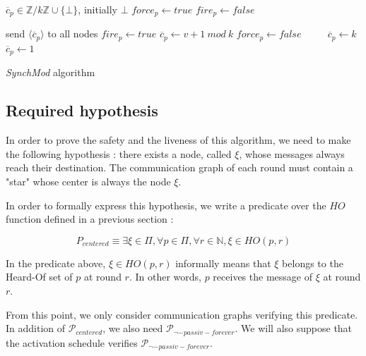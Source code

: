 \documentclass{article}
\begin{document}
\begin{algorithm}[htb]
\begin{distribalgo}[1]
\BLANK {}
	\STATE $\overline{c}_p \in \mathds{Z}/k\mathds{Z} \cup \{\bot\}$, initially $\bot$
	\STATE $force_p \leftarrow true$
	\STATE $fire_p \leftarrow false$

\ENDINDENT \BLANK

		\STATE send $\langle \overline{c}_p \rangle$ to all nodes
	\ENDINDENT
	\BLANK
			\STATE $fire_p \leftarrow true$
		\ENDIF
			\STATE $\overline{c}_p \leftarrow v+1~mod~k$
			\STATE $force_p \leftarrow false$ ~~~~
			\STATE $\overline{c}_p \leftarrow k$
		\ELSE
			\STATE $\overline{c}_p \leftarrow 1$ ~~~~
		\ENDIF
	\ENDINDENT
\ENDINDENT 
\caption{{\em SynchMod} algorithm} \label{algo:R}
\end{distribalgo}

\end{algorithm}

\subsection{Required hypothesis}

In order to prove the safety and the liveness of this algorithm, we need to make the following hypothesis :
there exists a node, called $\xi$, whose messages always reach their destination.
The communication graph of each round must contain a "star" whose center is always the node $\xi$.

In order to formally express this hypothesis, we write a predicate over the $HO$ function defined in a previous section :

$$P_{centered} \equiv \exists \xi \in \Pi, \forall p \in \Pi, \forall r \in \mathds{N}, \xi \in HO(p,r)$$

In the predicate above, $\xi \in HO(p,r)$ informally means that $\xi$ belongs to the Heard-Of set of $p$ at round $r$. In other words, $p$ receives the message of $\xi$ at round $r$.

From this point, we only consider communication graphs verifying this predicate.
In addition of $\mathcal{P}_{centered}$, we also need $\mathcal{P}_{\neg-passiv-forever}$.
We will also suppose that the activation schedule verifies $\mathcal{P}_{\neg-passiv-forever}$.
\end{document}
